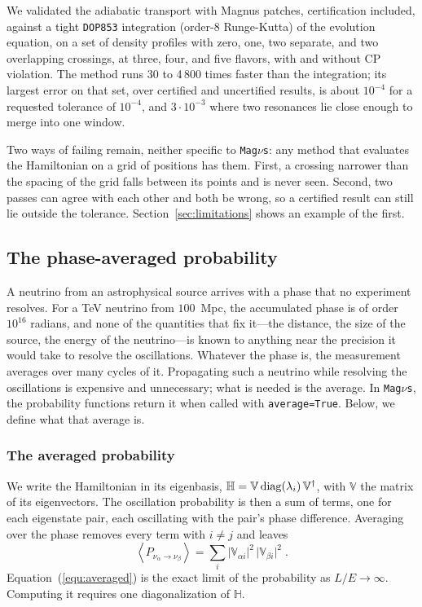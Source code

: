 \documentclass[final,5p,times,twocolumn,sort,compress]{elsarticle}
\makeatletter
\DeclareRobustCommand{\_}{%
  \ifmmode\nfss@text{\textunderscore}\else\textunderscore\allowbreak\fi}
\newcommand{\magnus}{{\tt Mag}\ensuremath{\nu}{\tt s}}
\makeatother
\begin{document}
We validated the adiabatic transport with Magnus patches, certification included, against a tight {\tt DOP853} integration (order-8 Runge-Kutta) of the evolution equation, on a set of density profiles with zero, one, two separate, and two overlapping crossings, at three, four, and five flavors, with and without CP violation. The method runs 30 to 4\,800 times faster than the integration; its largest error on that set, over certified and uncertified results, is about $10^{-4}$ for a requested tolerance of $10^{-4}$, and $3 \cdot 10^{-3}$ where two resonances lie close enough to merge into one window.

Two ways of failing remain, neither specific to \magnus: any method that evaluates the Hamiltonian on a grid of positions has them. First, a crossing narrower than the spacing of the grid falls between its points and is never seen. Second, two passes can agree with each other and both be wrong, so a certified result can still lie outside the tolerance. Section~\ref{sec:limitations} shows an example of the first.


\subsection{The phase-averaged probability}
\label{sec:averaged}

A neutrino from an astrophysical source arrives with a phase that no experiment resolves. For a TeV neutrino from $100$~Mpc, the accumulated phase is of order $10^{16}$ radians, and none of the quantities that fix it---the distance, the size of the source, the energy of the neutrino---is known to anything near the precision it would take to resolve the oscillations. Whatever the phase is, the measurement averages over many cycles of it. Propagating such a neutrino while resolving the oscillations is expensive and unnecessary; what is needed is the average. In \magnus, the probability functions return it when called with {\tt average=True}. Below, we define what that average is.


\subsubsection{The averaged probability}

We write the Hamiltonian in its eigenbasis, $\mathbb{H} = \mathbb{V}\,{\rm diag}(\lambda_i)\,\mathbb{V}^\dagger$, with $\mathbb{V}$ the matrix of its eigenvectors. The oscillation probability is then a sum of terms, one for each eigenstate pair, each oscillating with the pair's phase difference. Averaging over the phase removes every term with $i \neq j$ and leaves
\begin{equation}
 \label{equ:averaged}
 \left\langle P_{\nu_\alpha \to \nu_\beta} \right\rangle
 =
 \sum_i \lvert \mathbb{V}_{\alpha i}\rvert^2\, \lvert \mathbb{V}_{\beta i}\rvert^2 \;.
\end{equation}
Equation~(\ref{equ:averaged}) is the exact limit of the probability as $L/E \to \infty$. Computing it requires one diagonalization of $\mathbb{H}$.
\end{document}
